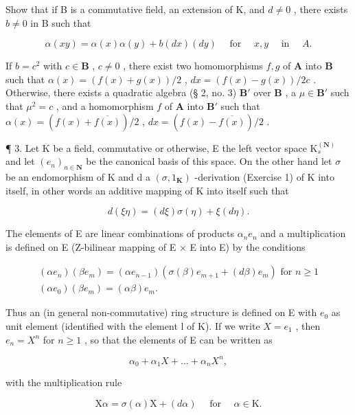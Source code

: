 Show that if B is a commutative field, an extension of K, and \(d \neq 0\) , there exists \(b \neq 0\) in B such that

\[
\alpha (x y) = \alpha (x) \alpha (y) + b (d x) (d y) \quad \text { for } \quad x, y \quad \text { in } \quad A.
\]

If \(b = c^2\) with \(c \in \mathbf{B}\) , \(c \neq 0\) , there exist two homomorphisms \(f, g\) of \(\mathbf{A}\) into \(\mathbf{B}\) such that \(\alpha(x) = (f(x) + g(x)) / 2\) , \(dx = (f(x) - g(x)) / 2c\) . Otherwise, there exists a quadratic algebra (§ 2, no. 3) \(\mathbf{B}'\) over \(\mathbf{B}\) , a \(\mu \in \mathbf{B}'\) such that \(\mu^2 = c\) , and a homomorphism \(f\) of \(\mathbf{A}\) into \(\mathbf{B}'\) such that \(\alpha(x) = (f(x) + \overline{f(x)}) / 2\) , \(dx = (f(x) - \overline{f(x)}) / 2\) .

¶ 3. Let K be a field, commutative or otherwise, E the left vector space \(\mathrm{K}_{s}^{(\mathbf{N})}\) and let \((e_{n})_{n\in\mathbf{N}}\) be the canonical basis of this space. On the other hand let \(\sigma\) be an endomorphism of K and d a \((\sigma,1_{\mathbf{K}})\) -derivation (Exercise 1) of K into itself, in other words an additive mapping of K into itself such that

\[
d (\xi \eta) = (d \xi) \sigma (\eta) + \xi (d \eta).
\]

The elements of E are linear combinations of products \(\alpha_{n}e_{n}\) and a multiplication is defined on E (Z-bilinear mapping of E × E into E) by the conditions

\[
\begin{array}{l} (\alpha e _ {n}) (\beta e _ {m}) = (\alpha e _ {n - 1}) (\sigma (\beta) e _ {m + 1} + (d \beta) e _ {m}) \text { for } n \geqslant 1 \\ (\alpha e _ {0}) (\beta e _ {m}) = (\alpha \beta) e _ {m}. \end{array}
\]

Thus an (in general non-commutative) ring structure is defined on E with \(e_{0}\) as unit element (identified with the element l of K). If we write \(X = e_{1}\) , then \(e_{n} = X^{n}\) for \(n \geqslant 1\) , so that the elements of E can be written as

\[
\alpha_ {0} + \alpha_ {1} X + \dots + \alpha_ {n} X ^ {n},
\]

with the multiplication rule

\[
\mathrm{X} \alpha = \sigma (\alpha) \mathrm{X} + (d \alpha) \quad \text { for } \quad \alpha \in \mathrm{K}.
\]

